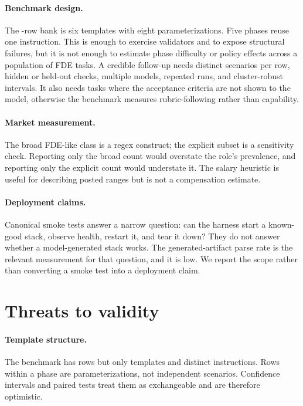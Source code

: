 \documentclass[11pt]{article}
\begin{document}
\paragraph{Benchmark design.} The \TaskRows{}-row bank is six templates with eight parameterizations. Five phases reuse one instruction. This is enough to exercise validators and to expose structural failures, but it is not enough to estimate phase difficulty or policy effects across a population of FDE tasks. A credible follow-up needs distinct scenarios per row, hidden or held-out checks, multiple models, repeated runs, and cluster-robust intervals. It also needs tasks where the acceptance criteria are not shown to the model, otherwise the benchmark measures rubric-following rather than capability.

\paragraph{Market measurement.} The broad FDE-like class is a regex construct; the explicit subset is a sensitivity check. Reporting only the broad count would overstate the role's prevalence, and reporting only the explicit count would understate it. The salary heuristic is useful for describing posted ranges but is not a compensation estimate.

\paragraph{Deployment claims.} Canonical smoke tests answer a narrow question: can the harness start a known-good stack, observe health, restart it, and tear it down? They do not answer whether a model-generated stack works. The generated-artifact parse rate is the relevant measurement for that question, and it is low. We report the scope rather than converting a smoke test into a deployment claim.

\section{Threats to validity}
\paragraph{Template structure.} The benchmark has \TaskRows{} rows but only \TaskTemplates{} templates and \DistinctInstructions{} distinct instructions. Rows within a phase are parameterizations, not independent scenarios. Confidence intervals and paired tests treat them as exchangeable and are therefore optimistic.
\end{document}
